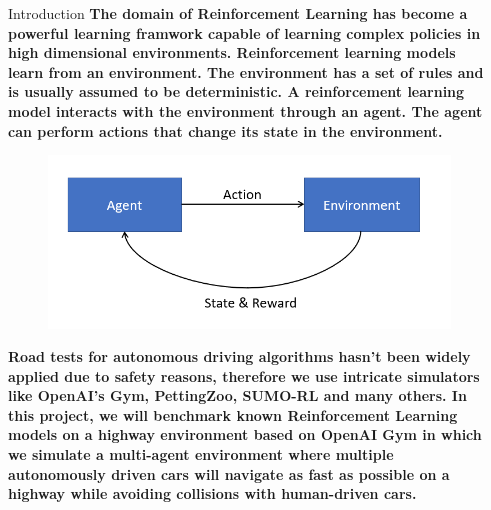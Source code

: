 \documentclass[final]{beamer}
\newlength{\sepmargin}
\newlength{\onecolwid}
\begin{document}
  \setlength{\belowcaptionskip}{2ex} %
  \setlength\belowdisplayshortskip{1ex} %
  

\begin{frame}[t] 
\begin{columns}[t] 
\begin{column}{\sepmargin}\end{column}
\begin{column}{\onecolwid} %
\vspace{1em}
  \begin{block}{Introduction}
\textbf{The domain of Reinforcement Learning has become a powerful learning framwork capable of learning
    complex policies in high dimensional environments. 
    Reinforcement learning models learn from an environment. The environment has a set of rules and is usually assumed to be deterministic. A reinforcement learning model interacts with the environment through an agent. The agent can perform actions that change its state in the environment.
\\}
\begin{figure}
    \vspace*{0.2cm}
    \includegraphics[width=0.6\linewidth]{images/rl_diag.png}
    \end{figure}

\textbf{Road tests for autonomous driving algorithms hasn't been widely applied due to safety reasons, therefore we use
    intricate simulators like OpenAI's Gym, PettingZoo, SUMO-RL and many others. In this project, we will benchmark known Reinforcement Learning
    models on a highway environment based on OpenAI Gym in which we simulate a multi-agent environment where multiple autonomously driven cars will navigate as fast as possible
    on a highway while avoiding collisions with human-driven cars.}

\end{block}
          

\end{column}
\end{columns}
\end{frame}
\end{document}

